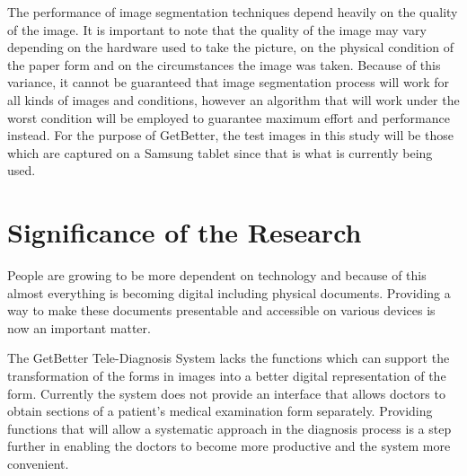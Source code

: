 The performance of image segmentation techniques depend heavily on the quality of the image. It is important to note that the quality of the image may vary depending on the hardware used to take the picture, on the physical condition of the paper form and on the circumstances the image was taken. Because of this variance, it cannot be guaranteed that image segmentation process will work for all kinds of images and conditions, however an algorithm that will work under the worst condition will be employed to guarantee maximum effort and performance instead. For the purpose of GetBetter, the test images in this study will be those which are captured on a Samsung tablet since that is what is currently being used.


\begin{comment}

%
%
Generally, one paragraph should be allotted for each of your research objectives.

Each paragraph contains a brief overview of the concept/theory and the purpose of doing the associated objective.

Each paragraph also includes a description of the scope/limitation of your study.

* Please refer to the slides for examples.

\end{comment}


\section{Significance of the Research}
\label{sec:significance}

People are growing to be more dependent on technology and because of this almost everything is becoming digital including physical documents. Providing a way to make these documents presentable and accessible on various devices is now an important matter.

The GetBetter Tele-Diagnosis System lacks the functions which can support the transformation of the forms in images into a better digital representation of the form. Currently the system does not provide an interface that allows doctors to obtain sections of a patient’s medical examination form separately. Providing functions that will allow a systematic approach in the diagnosis process is a step further in enabling the doctors to become more productive and the system more convenient.

